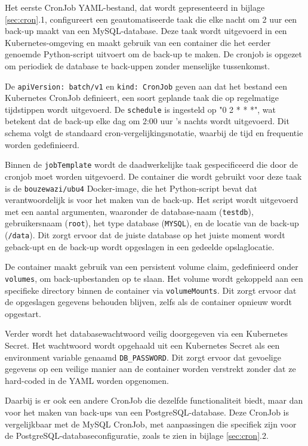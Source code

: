 Het eerste CronJob YAML-bestand, dat wordt gepresenteerd in bijlage \ref{sec:cron}.1,  configureert een geautomatiseerde taak die elke nacht om 2 uur een back-up maakt van een MySQL-database. Deze taak wordt uitgevoerd in een Kubernetes-omgeving en maakt gebruik van een container die het eerder genoemde Python-script uitvoert om de back-up te maken. De cronjob is opgezet om periodiek de database te back-uppen zonder menselijke tussenkomst.

De \texttt{apiVersion: batch/v1} en \texttt{kind: CronJob} geven aan dat het bestand een Kubernetes CronJob definieert, een soort geplande taak die op regelmatige tijdstippen wordt uitgevoerd. De \texttt{schedule} is ingesteld op "0 2 * * *", wat betekent dat de back-up elke dag om 2:00 uur 's nachts wordt uitgevoerd. Dit schema volgt de standaard cron-vergelijkingsnotatie, waarbij de tijd en frequentie worden gedefinieerd.

Binnen de \texttt{jobTemplate} wordt de daadwerkelijke taak gespecificeerd die door de cronjob moet worden uitgevoerd. De container die wordt gebruikt voor deze taak is de \texttt{bouzewazi/ubu4} Docker-image, die het Python-script bevat dat verantwoordelijk is voor het maken van de back-up. Het script wordt uitgevoerd met een aantal argumenten, waaronder de database-naam (\texttt{testdb}), gebruikersnaam (\texttt{root}), het type database (\texttt{MYSQL}), en de locatie van de back-up (\texttt{/data}). Dit zorgt ervoor dat de juiste database op het juiste moment wordt geback-upt en de back-up wordt opgeslagen in een gedeelde opslaglocatie.

De container maakt gebruik van een persistent volume claim, gedefinieerd onder \texttt{volumes}, om back-upbestanden op te slaan. Het volume wordt gekoppeld aan een specifieke directory binnen de container via \texttt{volumeMounts}. Dit zorgt ervoor dat de opgeslagen gegevens behouden blijven, zelfs als de container opnieuw wordt opgestart.

Verder wordt het databasewachtwoord veilig doorgegeven via een Kubernetes Secret. Het wachtwoord wordt opgehaald uit een Kubernetes Secret als een environment variable genaamd \texttt{DB\_PASSWORD}. Dit zorgt ervoor dat gevoelige gegevens op een veilige manier aan de container worden verstrekt zonder dat ze hard-coded in de YAML worden opgenomen.

Daarbij is er ook een andere CronJob die dezelfde functionaliteit biedt, maar dan voor het maken van back-ups van een PostgreSQL-database. Deze CronJob is vergelijkbaar met de MySQL CronJob, met aanpassingen die specifiek zijn voor de PostgreSQL-databaseconfiguratie, zoals te zien in bijlage \ref{sec:cron}.2.

